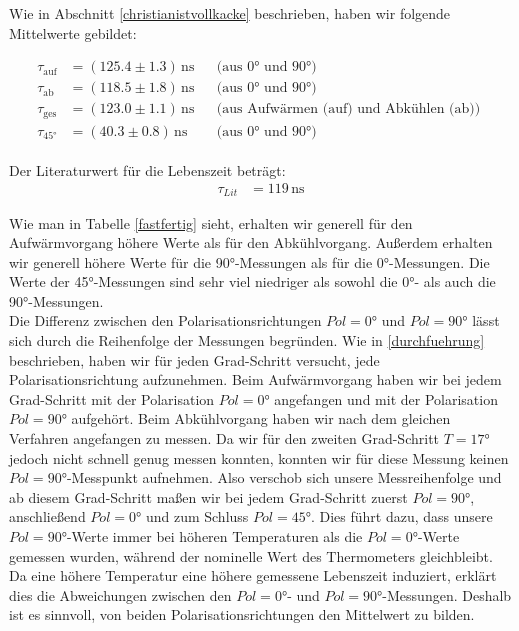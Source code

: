\documentclass[12pt]{article}
\begin{document}
Wie in Abschnitt \ref{christianistvollkacke} beschrieben, haben wir folgende Mittelwerte gebildet: 

\begin{align*}
\tau_\mathrm{auf} &= (125.4 \pm 1.3)\,\mathrm{ns}  &&\text{(aus 0° und 90°) }\\
\tau_\mathrm{ab} &= (118.5 \pm 1.8) \,\mathrm{ns}   & &\text{(aus 0° und 90°) }\\
\tau_\mathrm{ges} &= (123.0 \pm 1.1) \,\mathrm{ns}   & &\text{(aus Aufwärmen (auf) und Abkühlen (ab)) }\\
\tau_{45°} &= (40.3 \pm 0.8) \,\mathrm{ns}    &&\text{(aus 0° und 90°) }
\end{align*}

Der Literaturwert für die Lebenszeit beträgt\textsuperscript{\cite{anleitung}}:
\begin{align*}
	\tau_{Lit}&=119\,\mathrm{ns}
\end{align*}

Wie man in Tabelle \ref{fastfertig} sieht, erhalten wir generell für den Aufwärmvorgang höhere Werte als für den Abkühlvorgang. Außerdem erhalten wir generell höhere Werte für die 90°-Messungen als für die 0°-Messungen. Die Werte der 45°-Messungen sind sehr viel niedriger als sowohl die 0°- als auch die 90°-Messungen.\\

Die Differenz zwischen den Polarisationsrichtungen $Pol=0°$ und $Pol=90°$ lässt sich durch die Reihenfolge der Messungen begründen. Wie in \ref{durchfuehrung} beschrieben, haben wir für jeden Grad-Schritt versucht, jede Polarisationsrichtung aufzunehmen. Beim Aufwärmvorgang haben wir bei jedem Grad-Schritt mit der Polarisation $Pol=0°$ angefangen und mit der Polarisation $Pol=90°$ aufgehört. Beim Abkühlvorgang haben wir nach dem gleichen Verfahren angefangen zu messen. Da wir für den zweiten Grad-Schritt $T=17°$ jedoch nicht schnell genug messen konnten, konnten wir für diese Messung keinen $Pol=90°$-Messpunkt aufnehmen. Also verschob sich unsere Messreihenfolge und ab diesem Grad-Schritt maßen wir bei jedem Grad-Schritt zuerst $Pol=90°$, anschließend $Pol=0°$ und zum Schluss $Pol=45°$. Dies führt dazu, dass unsere $Pol=90°$-Werte immer bei höheren Temperaturen als die $Pol=0°$-Werte gemessen wurden, während der nominelle Wert des Thermometers gleichbleibt. Da eine höhere Temperatur eine höhere gemessene Lebenszeit induziert, erklärt dies die Abweichungen zwischen den $Pol=0°$- und $Pol=90°$-Messungen. Deshalb ist es sinnvoll, von beiden Polarisationsrichtungen den Mittelwert zu bilden.\\
\end{document}
